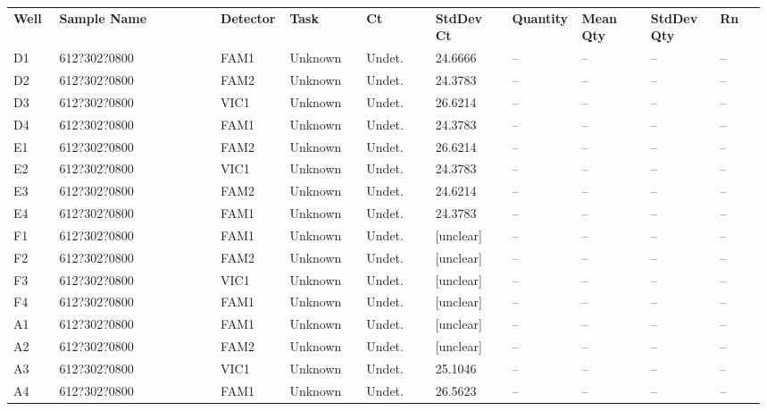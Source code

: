 \documentclass[UTF8,10pt,a4paper,fontset=fandol]{ctexart}
\begin{document}
\vspace{1em}

\begin{center}
\small
\begin{tabular}{p{0.06\linewidth}p{0.21\linewidth}p{0.09\linewidth}p{0.10\linewidth}p{0.09\linewidth}p{0.10\linewidth}p{0.09\linewidth}p{0.09\linewidth}p{0.09\linewidth}p{0.06\linewidth}}
\textbf{Well} & \textbf{Sample Name} & \textbf{Detector} & \textbf{Task} &
\textbf{Ct} & \textbf{StdDev Ct} & \textbf{Quantity} & \textbf{Mean Qty} &
\textbf{StdDev Qty} & \textbf{Rn} \\

D1 & 612?302?0800 & FAM1 & Unknown & Undet. & 24.6666 & -- & -- & -- & -- \\
D2 & 612?302?0800 & FAM2 & Unknown & Undet. & 24.3783 & -- & -- & -- & -- \\
D3 & 612?302?0800 & VIC1 & Unknown & Undet. & 26.6214 & -- & -- & -- & -- \\
D4 & 612?302?0800 & FAM1 & Unknown & Undet. & 24.3783 & -- & -- & -- & -- \\

E1 & 612?302?0800 & FAM2 & Unknown & Undet. & 26.6214 & -- & -- & -- & -- \\
E2 & 612?302?0800 & VIC1 & Unknown & Undet. & 24.3783 & -- & -- & -- & -- \\
E3 & 612?302?0800 & FAM2 & Unknown & Undet. & 24.6214 & -- & -- & -- & -- \\
E4 & 612?302?0800 & FAM1 & Unknown & Undet. & 24.3783 & -- & -- & -- & -- \\

F1 & 612?302?0800 & FAM1 & Unknown & Undet. & [unclear] & -- & -- & -- & -- \\
F2 & 612?302?0800 & FAM2 & Unknown & Undet. & [unclear] & -- & -- & -- & -- \\
F3 & 612?302?0800 & VIC1 & Unknown & Undet. & [unclear] & -- & -- & -- & -- \\
F4 & 612?302?0800 & FAM1 & Unknown & Undet. & [unclear] & -- & -- & -- & -- \\

A1 & 612?302?0800 & FAM1 & Unknown & Undet. & [unclear] & -- & -- & -- & -- \\
A2 & 612?302?0800 & FAM2 & Unknown & Undet. & [unclear] & -- & -- & -- & -- \\
A3 & 612?302?0800 & VIC1 & Unknown & Undet. & 25.1046 & -- & -- & -- & -- \\
A4 & 612?302?0800 & FAM1 & Unknown & Undet. & 26.5623 & -- & -- & -- & -- \\
\end{tabular}
\end{center}
\end{document}
